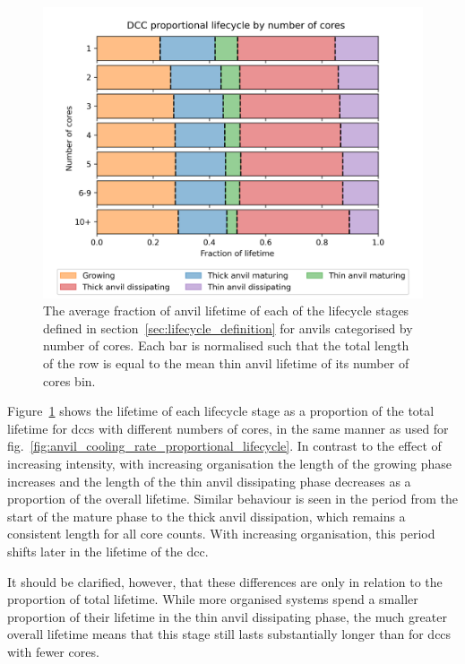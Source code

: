 \begin{figure}[tp]
    \centering
    \includegraphics[width=\textwidth]{figures/chapter3_12.png}
    \caption[
    The average fraction of anvil lifetime of each lifecycle stage for anvils categorised by number of cores
    ]{
    The average fraction of anvil lifetime of each of the lifecycle stages defined in section~\ref{sec:lifecycle_definition} for anvils categorised by number of cores. Each bar is normalised such that the total length of the row is equal to the mean thin anvil lifetime of its number of cores bin.
    }
    \label{fig:anvil_number_of_cores_proportional_lifecycle}
\end{figure}

Figure~\ref{fig:anvil_number_of_cores_proportional_lifecycle} shows the lifetime of each lifecycle stage as a proportion of the total lifetime for \acrshort{dcc}s with different numbers of cores, in the same manner as used for fig.~\ref{fig:anvil_cooling_rate_proportional_lifecycle}.
In contrast to the effect of increasing intensity, with increasing organisation the length of the growing phase increases and the length of the thin anvil dissipating phase decreases as a proportion of the overall lifetime.
Similar behaviour is seen in the period from the start of the mature phase to the thick anvil dissipation, which remains a consistent length for all core counts.
With increasing organisation, this period shifts later in the lifetime of the \acrshort{dcc}.

It should be clarified, however, that these differences are only in relation to the proportion of total lifetime.
While more organised systems spend a smaller proportion of their lifetime in the thin anvil dissipating phase, the much greater overall lifetime means that this stage still lasts substantially longer than for \acrfull{dcc}s with fewer cores.


